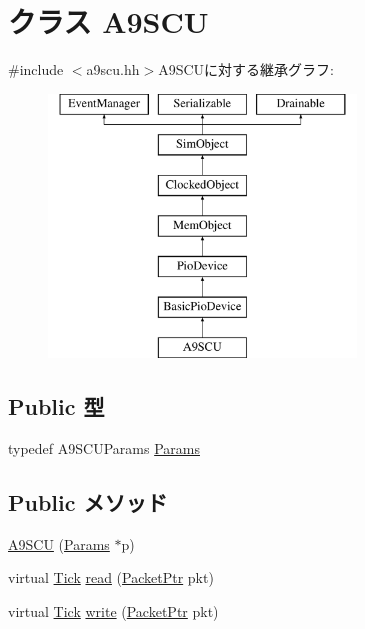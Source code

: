 \hypertarget{classA9SCU}{
\section{クラス A9SCU}
\label{classA9SCU}
}


{\ttfamily \#include $<$a9scu.hh$>$}A9SCUに対する継承グラフ:\begin{figure}[H]
\begin{center}
\leavevmode
\includegraphics[height=7cm]{classA9SCU}
\end{center}
\end{figure}
\subsection*{Public 型}
\begin{DoxyCompactItemize}
\item 
typedef A9SCUParams \hyperlink{classA9SCU_a6264a26c977c4e8d51cb6b3d6cd3a842}{Params}
\end{DoxyCompactItemize}
\subsection*{Public メソッド}
\begin{DoxyCompactItemize}
\item 
\hyperlink{classA9SCU_aafe83320aca70b23aeacd2370cc7c905}{A9SCU} (\hyperlink{classA9SCU_a6264a26c977c4e8d51cb6b3d6cd3a842}{Params} $\ast$p)
\item 
virtual \hyperlink{base_2types_8hh_a5c8ed81b7d238c9083e1037ba6d61643}{Tick} \hyperlink{classA9SCU_a613ec7d5e1ec64f8d21fec78ae8e568e}{read} (\hyperlink{classPacket}{PacketPtr} pkt)
\item 
virtual \hyperlink{base_2types_8hh_a5c8ed81b7d238c9083e1037ba6d61643}{Tick} \hyperlink{classA9SCU_a4cefab464e72b5dd42c003a0a4341802}{write} (\hyperlink{classPacket}{PacketPtr} pkt)
\end{DoxyCompactItemize}
